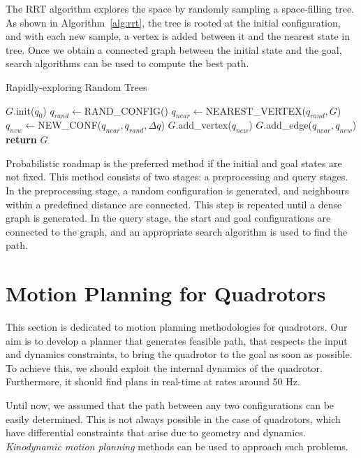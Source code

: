 The RRT algorithm explores the space by randomly sampling a space-filling tree. As shown in Algorithm~\ref{alg:rrt}, the tree is rooted at the initial configuration, and with each new sample, a vertex is added between it and the nearest state in tree. Once we obtain a connected graph between the initial state and the goal, search algorithms can be used to compute the best path. 

\begin{algorithm}
\caption{Rapidly-exploring Random Trees}\label{alg:rrt}
\begin{algorithmic}[1]
\State $G$.init($q_0$)
\State $q_{rand}\gets$RAND\_CONFIG()
\State $q_{near}\gets$NEAREST\_VERTEX($q_{rand},G$)
\State $q_{new}\gets$NEW\_CONF($q_{near}, q_{rand}, \Delta q$)
\State $G$.add\_vertex($q_{new}$)
\State $G$.add\_edge($q_{near},q_{new}$)
\EndFor
\State \textbf{return} $G$

\end{algorithmic}
\end{algorithm}
Probabilistic roadmap is the preferred method if the initial and goal states are not fixed. This method consists of two stages: a preprocessing and query stages. In the preprocessing stage, a random configuration is generated, and neighbours within a predefined distance are connected. This step is repeated until a dense graph is generated. In the query stage, the start and goal configurations are connected to the graph, and an appropriate search algorithm is used to find the path. 

\section{Motion Planning for Quadrotors}
\label{sec:planning_quadrotors}
This section is dedicated to motion planning methodologies for quadrotors. 
Our aim is to develop a planner that generates feasible path, that respects the input and dynamics constraints, to bring the quadrotor to the goal as soon as possible. To achieve this, we should exploit the internal dynamics of the quadrotor. Furthermore, it should find plans in real-time at rates around 50 Hz. 

Until now, we assumed that the path between any two configurations can be easily determined. This is not always possible in the case of quadrotors, which have differential constraints that arise due to geometry and dynamics. \textit{Kinodynamic motion planning} \cite{donald1993kinodynamic} methods can be used to approach such problems. 

